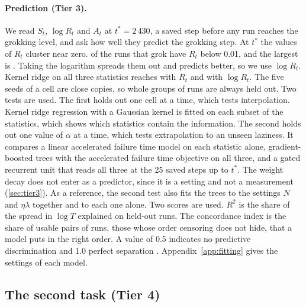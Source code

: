 \documentclass[a4paper,11pt]{article} %
\newcommand{\tstar}{t^{\ast}}
\begin{document}
\paragraph{Prediction (Tier 3).} We read $S_t$, $\log R_t$ and $A_t$ at
$\tstar=2\,430$, a saved step before any run reaches the grokking level, and
ask how well they predict the grokking step. At $\tstar$ the values of $R_t$
cluster near zero. \EtenRawRSmall{} of the runs that grok have $R_t$ below
0.01, and the largest is \EtenRawRMax. Taking the logarithm spreads them out
and predicts better, so we use $\log R_t$. Kernel ridge on all three statistics
reaches \EtenRawKrrSRARsq{} with $R_t$ and \EtenSRARsq{} with $\log R_t$.
The five seeds of a cell are close
copies, so whole groups of runs are always held out. Two tests are used. The
first holds out one cell at a time, which tests interpolation. Kernel ridge
regression with a Gaussian kernel is fitted on each subset of the statistics,
which shows which statistics contain the information. The second holds out one
value of $\alpha$ at a time, which tests extrapolation to an unseen laziness.
It compares a linear accelerated failure time model on each statistic alone,
gradient-boosted trees with the accelerated failure time objective
\citep{chenXGBoostScalableTree2016} on all three, and a gated recurrent unit
\citep{choLearningPhraseRepresentations2014} that reads all three at the 25
saved steps up to $\tstar$. The weight decay does not enter as a predictor,
since it is a setting and not a measurement (\cref{sec:tier3}). As a reference,
the second test also fits the trees to the settings $N$ and $\eta\lambda$
together and to each one alone. Two scores are used. $R^2$ is the share of the
spread in $\log T$ explained on held-out runs. The concordance index
is the share of usable pairs of runs, those whose order censoring does not
hide, that a model puts in the right order. A value of 0.5 indicates no
predictive discrimination and 1.0 perfect separation
\citep{harrellEvaluatingYieldMedical1982,harrellMULTIVARIABLEPROGNOSTICMODELS1996}.
Appendix~\ref{app:fitting} gives the
settings of each model.

\subsection{The second task (Tier 4)}\label{sec:mnistsetup}
\end{document}
